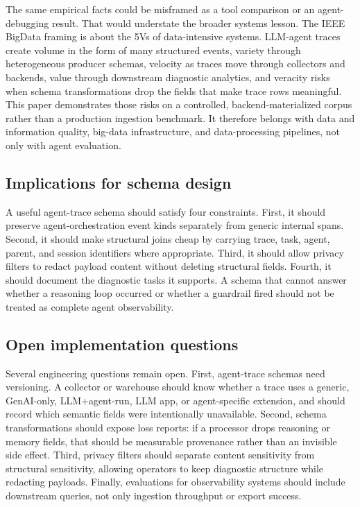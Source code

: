 \documentclass[conference]{IEEEtran}
\begin{document}
The same empirical facts could be misframed as a tool comparison or an
agent-debugging result. That would understate the broader systems
lesson. The IEEE BigData framing is about the 5Vs of data-intensive
systems. LLM-agent traces create volume in the form of many structured
events, variety through heterogeneous producer schemas, velocity as
traces move through collectors and backends, value through downstream
diagnostic analytics, and veracity risks when schema transformations
drop the fields that make trace rows meaningful. This paper demonstrates
those risks on a controlled, backend-materialized corpus rather than a
production ingestion benchmark. It therefore belongs with data and
information quality, big-data infrastructure, and data-processing
pipelines, not only with agent evaluation.

\subsection{Implications for schema design}

A useful agent-trace schema should satisfy four constraints. First, it
should preserve agent-orchestration event kinds separately from generic
internal spans. Second, it should make structural joins cheap by
carrying trace, task, agent, parent, and session identifiers where
appropriate. Third, it should allow privacy filters to redact payload
content without deleting structural fields. Fourth, it should document
the diagnostic tasks it supports. A schema that cannot answer whether a
reasoning loop occurred or whether a guardrail fired should not be
treated as complete agent observability.

\subsection{Open implementation questions}

Several engineering questions remain open. First, agent-trace schemas
need versioning. A collector or warehouse should know whether a trace
uses a generic, GenAI-only, LLM+agent-run, LLM app, or agent-specific
extension, and should record which semantic fields were intentionally
unavailable. Second, schema transformations should expose loss reports:
if a processor drops reasoning or memory fields, that should be
measurable provenance rather than an invisible side effect. Third,
privacy filters should separate content sensitivity from structural
sensitivity, allowing operators to keep diagnostic structure while
redacting payloads. Finally, evaluations for observability systems
should include downstream queries, not only ingestion throughput or
export success.
\end{document}

